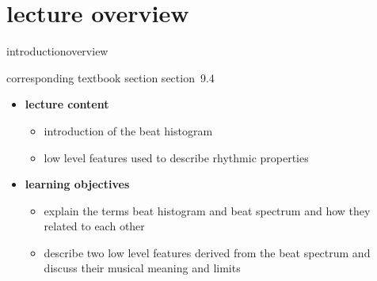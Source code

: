 


\subtitle{Module 9.4: Beat Histogram}


	

    \section[overview]{lecture overview}
        \begin{frame}{introduction}{overview}
            \begin{block}{corresponding textbook section}
                    section~9.4
            \end{block}

            \begin{itemize}
                \item   \textbf{lecture content}
                    \begin{itemize}
                        \item   introduction of the beat histogram
                        \item   low level features used to describe rhythmic properties
                    \end{itemize}
                \bigskip
                \item<2->   \textbf{learning objectives}
                    \begin{itemize}
                        \item   explain the terms beat histogram and beat spectrum and how they related to each other
                        \item   describe two low level features derived from the beat spectrum and discuss their musical meaning and limits
                    \end{itemize}
            \end{itemize}
        \end{frame}

